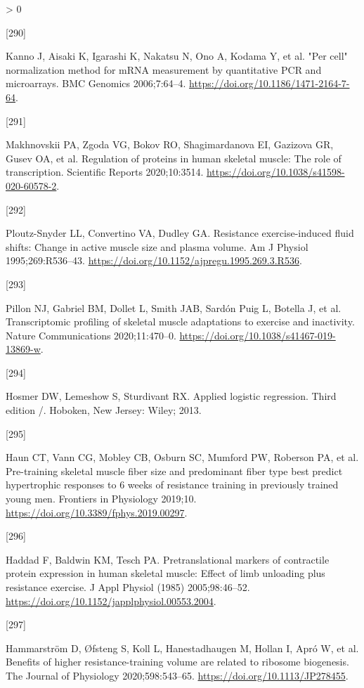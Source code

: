\documentclass[twoside,10pt]{gihclass} %
\newlength{\cslhangindent}
\newlength{\csllabelwidth}
\newenvironment{CSLReferences}[3] %
 {%
  \setlength{\parindent}{0pt}
  \ifodd #1 \everypar{\setlength{\hangindent}{\cslhangindent}}\ignorespaces\fi
  \ifnum #2 > 0
  \setlength{\parskip}{#2\baselineskip}
  \fi
 }%
 {}
\newcommand{\CSLLeftMargin}[1]{\parbox[t]{\maxof{\widthof{#1}}{\csllabelwidth}}{#1}}
\newcommand{\CSLRightInline}[1]{\parbox[t]{\linewidth}{#1}}
\begin{document}
\begin{CSLReferences}{0}{0}
\leavevmode\hypertarget{ref-RN2182}{}%
\CSLLeftMargin{{[}290{]} }
\CSLRightInline{Kanno J, Aisaki K, Igarashi K, Nakatsu N, Ono A, Kodama Y, et al. "Per cell" normalization method for mRNA measurement by quantitative PCR and microarrays. BMC Genomics 2006;7:64--4. \url{https://doi.org/10.1186/1471-2164-7-64}.}

\leavevmode\hypertarget{ref-RN2448}{}%
\CSLLeftMargin{{[}291{]} }
\CSLRightInline{Makhnovskii PA, Zgoda VG, Bokov RO, Shagimardanova EI, Gazizova GR, Gusev OA, et al. Regulation of proteins in human skeletal muscle: The role of transcription. Scientific Reports 2020;10:3514. \url{https://doi.org/10.1038/s41598-020-60578-2}.}

\leavevmode\hypertarget{ref-RN2270}{}%
\CSLLeftMargin{{[}292{]} }
\CSLRightInline{Ploutz-Snyder LL, Convertino VA, Dudley GA. Resistance exercise-induced fluid shifts: Change in active muscle size and plasma volume. Am J Physiol 1995;269:R536--43. \url{https://doi.org/10.1152/ajpregu.1995.269.3.R536}.}

\leavevmode\hypertarget{ref-RN2360}{}%
\CSLLeftMargin{{[}293{]} }
\CSLRightInline{Pillon NJ, Gabriel BM, Dollet L, Smith JAB, Sardón Puig L, Botella J, et al. Transcriptomic profiling of skeletal muscle adaptations to exercise and inactivity. Nature Communications 2020;11:470--0. \url{https://doi.org/10.1038/s41467-019-13869-w}.}

\leavevmode\hypertarget{ref-RN1998}{}%
\CSLLeftMargin{{[}294{]} }
\CSLRightInline{Hosmer DW, Lemeshow S, Sturdivant RX. Applied logistic regression. Third edition /. Hoboken, New Jersey: Wiley; 2013.}

\leavevmode\hypertarget{ref-RN2225}{}%
\CSLLeftMargin{{[}295{]} }
\CSLRightInline{Haun CT, Vann CG, Mobley CB, Osburn SC, Mumford PW, Roberson PA, et al. Pre-training skeletal muscle fiber size and predominant fiber type best predict hypertrophic responses to 6 weeks of resistance training in previously trained young men. Frontiers in Physiology 2019;10. \url{https://doi.org/10.3389/fphys.2019.00297}.}

\leavevmode\hypertarget{ref-RN2180}{}%
\CSLLeftMargin{{[}296{]} }
\CSLRightInline{Haddad F, Baldwin KM, Tesch PA. Pretranslational markers of contractile protein expression in human skeletal muscle: Effect of limb unloading plus resistance exercise. J Appl Physiol (1985) 2005;98:46--52. \url{https://doi.org/10.1152/japplphysiol.00553.2004}.}

\leavevmode\hypertarget{ref-RN2358}{}%
\CSLLeftMargin{{[}297{]} }
\CSLRightInline{Hammarström D, Øfsteng S, Koll L, Hanestadhaugen M, Hollan I, Apró W, et al. Benefits of higher resistance-training volume are related to ribosome biogenesis. The Journal of Physiology 2020;598:543--65. \url{https://doi.org/10.1113/JP278455}.}


\end{CSLReferences}
\end{document}
